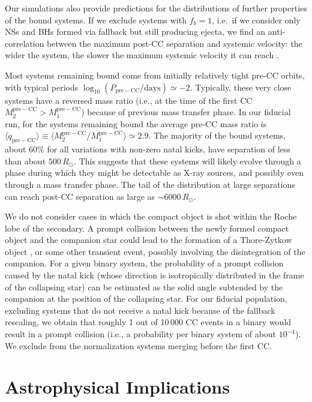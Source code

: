\documentclass{aa}
\begin{document}
Our simulations also provide predictions for the distributions of further properties of the bound systems.  
If we exclude systems with $f_b=1$, i.e.\ if we consider only NSs and
BHs formed via fallback but still producing ejecta, we find
an anti-correlation between the maximum post-CC separation and systemic
velocity: the wider the system, the slower the maximum systemic
velocity it can reach \citep[see also][]{brandt:95}. 

Most systems remaining bound come from initially 
relatively tight pre-CC orbits, with typical periods $\log_{10}(P_\mathrm{pre-CC}/\mathrm{days})\simeq -2$. Typically, these very close systems have a reversed mass ratio
(i.e., at the time of the first CC $M_2^\mathrm{pre-CC}>M_1^\mathrm{pre-CC}$)
because of previous mass transfer phase. In our fiducial run, for the
systems remaining bound the average pre-CC mass ratio is
$\langle q_\mathrm{pre-CC}\rangle\equiv\langle
M_2^\mathrm{pre-CC}/M_1^\mathrm{pre-CC}\rangle\simeq 2.9$.
The majority of the bound systems, about $60\%$ for all variations
with non-zero natal kicks, have separation of less than
about $500\,R_\odot$. This suggests that these systems will likely
evolve through a phase during which they might be detectable as X-ray
sources, and possibly even through a mass transfer phase. The tail of the distribution at large separations can reach
post-CC separation as large as $\sim6000\,R_\odot$.

We do not consider cases in which the compact object is shot within the
Roche lobe of the secondary. A prompt collision between the
newly formed compact object and the companion star could lead to the
formation of a Thore-Zytkow object \citep[if the compact object is a
NS,][]{thorne:75,thorne:77, leonard:94}, or some other transient
event, possibly involving the disintegration of the companion. For a given binary system, the probability of a prompt collision
caused by the natal kick (whose direction is isotropically distributed
in the frame of the collapsing star) can be estimated as the solid
angle subtended by the companion at the position of the collapsing
star. For our fiducial population, excluding systems that do not
receive a natal kick because of the fallback rescaling, we obtain that
roughly 1 out of 10\,000 CC events in a binary would result in a
prompt collision (i.e., a probability per binary system of about
$10^{-4}$). We exclude from the normalization systems merging before the first CC.


\section{Astrophysical Implications}
\label{sec:discussion}
\end{document}
